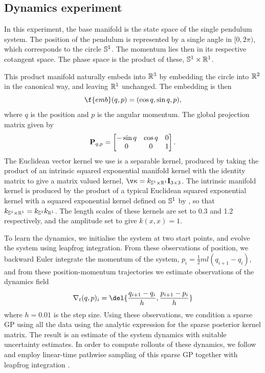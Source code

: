 \subsection*{Dynamics experiment}

In this experiment, the base manifold is the state space of the single pendulum system.
The position of the pendulum is represented by a single angle in $[0, 2\pi)$, which corresponds to the circle $\bb{S}^1$.
The momentum lies then in its respective cotangent space.
The phase space is the product of these, $\bb{S}^1 \x \R^1$.

This product manifold naturally embeds into $\mathbb{R}^3$ by embedding the circle into $\mathbb{R}^2$ in the canonical way, and leaving $\mathbb{R}^1$ unchanged.
The embedding is then \[ \f{emb}(q,p) = (\cos{q}, \sin{q}, p), \] where $q$ is the position and $p$ is the angular momentum.
The global projection matrix given by \[ \m{P}_{q, p} = \begin{bmatrix} -\sin{q} & \cos{q} & 0 \\ 0 & 0 & 1 \end{bmatrix}.
\]
The Euclidean vector kernel we use is a separable kernel, produced by taking the product of an intrinsic squared exponential manifold kernel with the identity matrix to give a matrix valued kernel, \( \v\kappa = k_{\bb{S}^1 \x \R^1} \m{I}_{3 \x 3} \).
The intrinsic manifold kernel is produced by the product of a typical Euclidean squared exponential kernel with a squared exponential kernel defined on $\bb{S}^1$ by \textcite{Borovitskiy2020}, so that \(k_{\bb{S}^1 \x \R^1} = k_{\bb{S}^1} k_{\R^1}\).
The length scales of these kernels are set to 0.3 and 1.2 respectively, and the amplitude set to give $k(x,x) = 1$.

To learn the dynamics, we initialise the system at two start points, and evolve the system using leapfrog integration.
From these observations of position, we backward Euler integrate the momentum of the system, $p_i = \frac{1}{2} ml( q_{i+1} - q_i)$, and from these position-momentum trajectories we estimate observations of the dynamics field \[ \nabla_t ({q, p})_i = \del{\frac{q_{i+1} - q_i}{h} , \frac{p_{i+1} - p_i}{h}} \] where $h = 0.01$ is the step size.
Using these observations, we condition a sparse GP using all the data using the analytic expression for the sparse posterior kernel matrix.
The result is an estimate of the system dynamics with suitable uncertainty estimates.
In order to compute rollouts of these dynamics, we follow \textcite{wilson2020pathwise,wilson2021pathwise} and employ linear-time pathwise sampling of this sparse GP together with leapfrog integration \cite{hairer06}.


